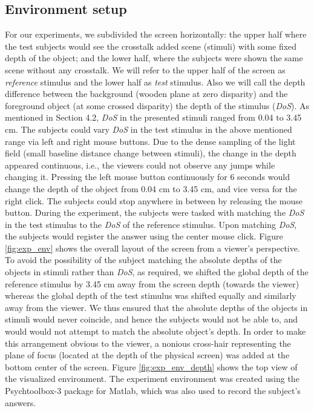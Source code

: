 \subsection{Environment setup}
For our experiments, we subdivided the screen horizontally: the upper half where the test subjects would see the crosstalk added scene (stimuli) with some fixed depth of the object; and the lower half, where the subjects were shown the same scene without any crosstalk. We will refer to the upper half of the screen as \emph{reference} stimulus and the lower half as \emph{test} stimulus. Also we will call the depth difference between the background (wooden plane at zero disparity) and the foreground object (at some crossed disparity) the depth of the stimulus (\emph{DoS}). As mentioned in Section 4.2, \emph{DoS} in the presented stimuli ranged from 0.04 to 3.45 cm. The subjects could vary \emph{DoS} in the test stimulus in the above mentioned range via left and right mouse buttons. Due to the dense sampling of the light field (small baseline distance change between stimuli), the change in the depth appeared continuous, i.e., the viewers could not observe any jumps while changing it. Pressing the left mouse button continuously for 6 seconds would change the depth of the object from 0.04 cm to 3.45 cm, and vice versa for the right click. The subjects could stop anywhere in between by releasing the mouse button. During the experiment, the subjects were tasked with matching the \emph{DoS} in the test stimulus to the \emph{DoS} of the reference stimulus. Upon matching \emph{DoS}, the subjects would register the answer using the center mouse click. Figure \ref{fig:exp_env} shows the overall layout of the screen from a viewer's perspective. To avoid the possibility of the subject matching the absolute depths of the objects in stimuli rather than \emph{DoS}, as required, we shifted the global depth of the reference stimulus by 3.45 cm away from the screen depth (towards the viewer) whereas the global depth of the test stimulus was shifted equally and similarly away from the viewer. We thus ensured that the absolute depths of the objects in stimuli would never coincide, and hence the subjects would not be able to, and would would not attempt to match the absolute object's depth. In order to make this arrangement obvious to the viewer, a nonious cross-hair representing the plane of focus (located at the depth of the physical screen) was added at the bottom center of the screen. Figure \ref{fig:exp_env_depth} shows the top view of the visualized environment. The experiment environment was created using the Psychtoolbox-3 package for Matlab, which was also used to record the subject's answers.
